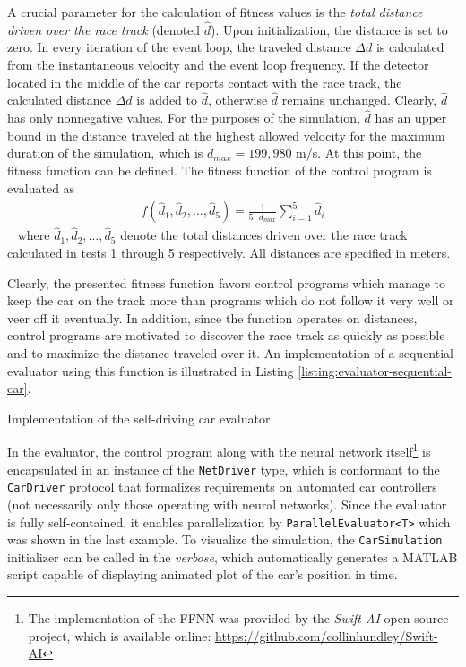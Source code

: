 A crucial parameter for the calculation of fitness values is the \textit{total distance driven over the race track} (denoted $\hat{d}$). Upon initialization, the distance is set to zero. In every iteration of the event loop, the traveled distance $\Delta d$ is calculated from the instantaneous velocity and the event loop frequency. If the detector located in the middle of the car reports contact with the race track, the calculated distance $\Delta d$ is added to $\hat{d}$, otherwise $\hat{d}$ remains unchanged. Clearly, $\hat{d}$ has only nonnegative values. For the purposes of the simulation, $\hat{d}$ has an upper bound in the distance traveled at the highest allowed velocity for the maximum duration of the simulation, which is $d_{max}=199,980$ m/s. At this point, the fitness function can be defined. The fitness function of the control program is evaluated as
~
\begin{align}
	f(\hat{d}_1,\hat{d}_2,\dots,\hat{d}_5) = \frac{1}{5 \cdot d_{max}} \sum_{i=1}^5 \hat{d}_i
\end{align}
~
where $\hat{d}_1,\hat{d}_2,\dots,\hat{d}_5$ denote the total distances driven over the race track calculated in tests 1 through 5 respectively. All distances are specified in meters.

Clearly, the presented fitness function favors control programs which manage to keep the car on the track more than programs which do not follow it very well or veer off it eventually. In addition, since the function operates on distances, control programs are motivated to discover the race track as quickly as possible and to maximize the distance traveled over it. An implementation of a sequential evaluator using this function is illustrated in Listing \ref{listing:evaluator-sequential-car}.

\begin{listing}[ht]
	\caption{Implementation of the self-driving car evaluator.}
	\label{listing:evaluator-sequential-car}
\end{listing}

In the evaluator, the control program along with the neural network itself\footnote{The implementation of the FFNN was provided by the \textit{Swift AI} open-source project, which is available online: \url{https://github.com/collinhundley/Swift-AI}} is encapsulated in an instance of the \texttt{NetDriver} type, which is conformant to the \texttt{CarDriver} protocol that formalizes requirements on automated car controllers (not necessarily only those operating with neural networks). Since the evaluator is fully self-contained, it enables parallelization by \texttt{ParallelEvaluator<T>} which was shown in the last example. To visualize the simulation, the \texttt{CarSimulation} initializer can be called in the \textit{verbose}, which automatically generates a MATLAB script capable of displaying animated plot of the car's position in time.

